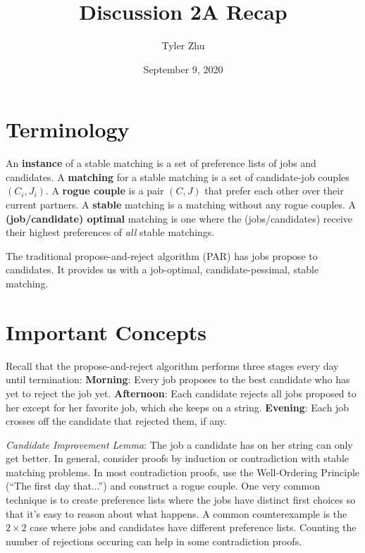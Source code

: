 \documentclass[11 pt]{scrartcl}
\newcommand{\hwtitle}{Discussion 2A Recap}
\begin{document}
 
\title{\Large \hwtitle{}}
\author{\large Tyler Zhu}
\date{\large September 9, 2020}

\maketitle 

\section{Terminology}
\itemnum
    \ii An \textbf{instance} of a stable matching is a set of preference lists of jobs and candidates. 
    \ii A \textbf{matching} for a stable matching is a set of candidate-job couples $(C_i, J_i)$. 
    \ii A \textbf{rogue couple} is a pair $(C,J)$ that prefer each other over their current partners. 
    \ii A \textbf{stable} matching is a matching without any rogue couples. 
    \ii A \textbf{(job/candidate) optimal} matching is one where the (jobs/candidates) receive their highest preferences of \emph{all} stable matchings. 
\itemend

The traditional propose-and-reject algorithm (PAR) has jobs propose to candidates. It provides us with a job-optimal, candidate-pessimal, stable matching.  

\section{Important Concepts}
Recall that the propose-and-reject algorithm performs three stages every day until termination: 
\alphanum
    \ii \textbf{Morning}: Every job proposes to the best candidate who has yet to reject the job yet.  
    \ii \textbf{Afternoon}: Each candidate rejects all jobs proposed to her except for her favorite job, which she keeps on a string. 
    \ii \textbf{Evening}: Each job crosses off the candidate that rejected them, if any.
\enumend

\itemnum
    \ii \emph{Candidate Improvement Lemma}: The job a candidate has on her string can only get better. 
    \ii In general, consider proofs by induction or contradiction with stable matching problems. In most contradiction proofs, use the Well-Ordering Principle (``The first day that...'') and construct a rogue couple. 
    \ii One very common technique is to create preference lists where the jobs have distinct first choices so that it's easy to reason about what happens.
    \ii A common counterexample is the $2\times 2$ case where jobs and candidates have different preference lists. 
    \ii Counting the number of rejections occuring can help in some contradiction proofs.
\itemend
\end{document}
